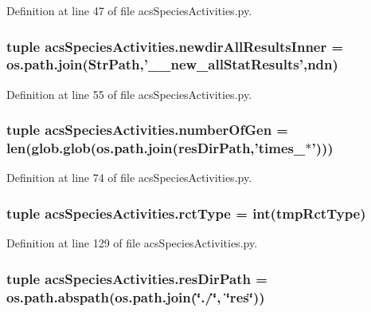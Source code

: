 Definition at line 47 of file acs\-Species\-Activities.\-py.

\hypertarget{a00097_ae77a5ce35739a29f29f9df698d91f1c9}{
\subsubsection[{newdir\-All\-Results\-Inner}]{\setlength{\rightskip}{0pt plus 5cm}tuple acs\-Species\-Activities.\-newdir\-All\-Results\-Inner = os.\-path.\-join({\bf Str\-Path},'\-\_\-\_\-new\-\_\-all\-Stat\-Results',{\bf ndn})}}\label{a00097_ae77a5ce35739a29f29f9df698d91f1c9}


Definition at line 55 of file acs\-Species\-Activities.\-py.

\hypertarget{a00097_acceae37ca98ccf6dc25c9f538fda386f}{
\subsubsection[{number\-Of\-Gen}]{\setlength{\rightskip}{0pt plus 5cm}tuple acs\-Species\-Activities.\-number\-Of\-Gen = len(glob.\-glob(os.\-path.\-join({\bf res\-Dir\-Path},'times\-\_\-$\ast$')))}}\label{a00097_acceae37ca98ccf6dc25c9f538fda386f}


Definition at line 74 of file acs\-Species\-Activities.\-py.

\hypertarget{a00097_abdc37f53b75138949fbbe9f9e42f1e6f}{
\subsubsection[{rct\-Type}]{\setlength{\rightskip}{0pt plus 5cm}tuple acs\-Species\-Activities.\-rct\-Type = int(tmp\-Rct\-Type)}}\label{a00097_abdc37f53b75138949fbbe9f9e42f1e6f}


Definition at line 129 of file acs\-Species\-Activities.\-py.

\hypertarget{a00097_a2c1728d3ec9815ec7cf41653e953524c}{
\subsubsection[{res\-Dir\-Path}]{\setlength{\rightskip}{0pt plus 5cm}tuple acs\-Species\-Activities.\-res\-Dir\-Path = os.\-path.\-abspath(os.\-path.\-join(\char`\"{}./\char`\"{}, \char`\"{}res\char`\"{}))}}\label{a00097_a2c1728d3ec9815ec7cf41653e953524c}


